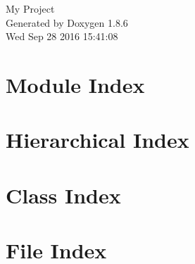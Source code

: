 \documentclass[twoside]{book}
\newcommand{\clearemptydoublepage}{%
  \newpage{\pagestyle{empty}\cleardoublepage}%
}
\begin{document}
\hypersetup{pageanchor=false}
\begin{titlepage}
\vspace*{7cm}
\begin{center}%
{\Large My Project }\\
\vspace*{1cm}
{\large Generated by Doxygen 1.8.6}\\
\vspace*{0.5cm}
{\small Wed Sep 28 2016 15:41:08}\\
\end{center}
\end{titlepage}
\clearemptydoublepage
\tableofcontents
\clearemptydoublepage
{}
\hypersetup{pageanchor=true}

\chapter{Module Index}

\chapter{Hierarchical Index}

\chapter{Class Index}

\chapter{File Index}

\end{document}
